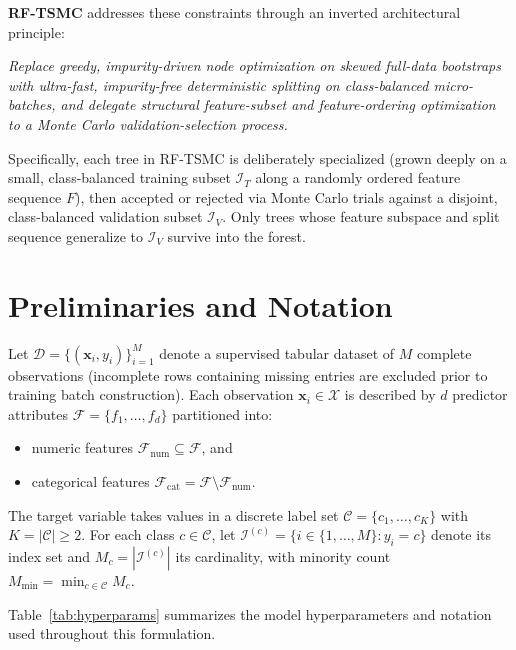 \documentclass[11pt,a4paper]{article}
\begin{document}
\textbf{RF-TSMC} addresses these constraints through an inverted architectural principle:
\begin{principlebox}
\emph{Replace greedy, impurity-driven node optimization on skewed full-data bootstraps with ultra-fast, impurity-free deterministic splitting on class-balanced micro-batches, and delegate structural feature-subset and feature-ordering optimization to a Monte Carlo validation-selection process.}
\end{principlebox}

Specifically, each tree in RF-TSMC is deliberately specialized (grown deeply on a small, class-balanced training subset $\mathcal{I}_T$ along a randomly ordered feature sequence $F$), then accepted or rejected via Monte Carlo trials against a disjoint, class-balanced validation subset $\mathcal{I}_V$. Only trees whose feature subspace and split sequence generalize to $\mathcal{I}_V$ survive into the forest.

\section{Preliminaries and Notation}

Let $\mathcal{D} = \{(\mathbf{x}_i, y_i)\}_{i=1}^{M}$ denote a supervised tabular dataset of $M$ complete observations (incomplete rows containing missing entries are excluded prior to training batch construction). Each observation $\mathbf{x}_i \in \mathcal{X}$ is described by $d$ predictor attributes $\mathcal{F} = \{f_1, \dots, f_d\}$ partitioned into:
\begin{itemize}[leftmargin=*, itemsep=2pt]
  \item numeric features $\mathcal{F}_{\text{num}} \subseteq \mathcal{F}$, and
  \item categorical features $\mathcal{F}_{\text{cat}} = \mathcal{F} \setminus \mathcal{F}_{\text{num}}$.
\end{itemize}
The target variable takes values in a discrete label set $\mathcal{C} = \{c_1, \dots, c_K\}$ with $K = |\mathcal{C}| \ge 2$. For each class $c \in \mathcal{C}$, let $\mathcal{I}^{(c)} = \{i \in \{1, \dots, M\} : y_i = c\}$ denote its index set and $M_c = |\mathcal{I}^{(c)}|$ its cardinality, with minority count $M_{\min} = \min_{c \in \mathcal{C}} M_c$.

Table~\ref{tab:hyperparams} summarizes the model hyperparameters and notation used throughout this formulation.
\end{document}
